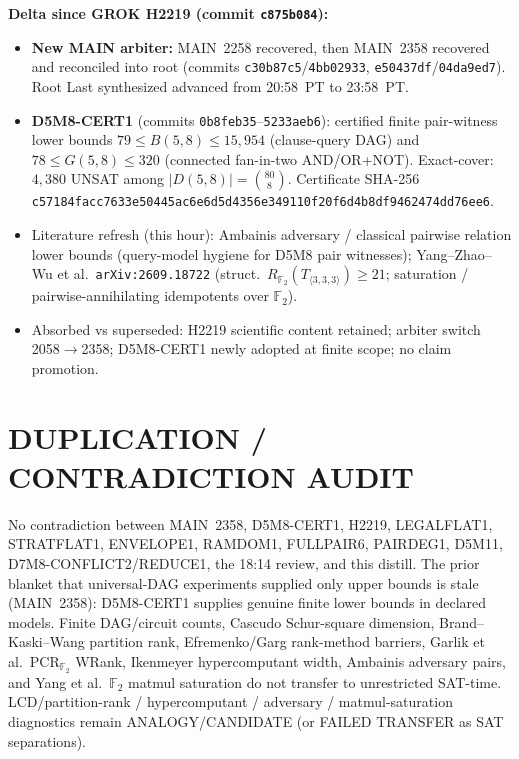 \documentclass[11pt]{article}
\begin{document}
\textbf{Delta since GROK H2219 (commit \texttt{c875b084}):}
\begin{itemize}
\item \textbf{New MAIN arbiter:} MAIN~2258 recovered, then MAIN~2358 recovered
and reconciled into root (commits \texttt{c30b87c5}/\texttt{4bb02933},
\texttt{e50437df}/\texttt{04da9ed7}). Root Last synthesized advanced from
20:58~PT to 23:58~PT.
\item \textbf{D5M8-CERT1} (commits \texttt{0b8feb35}--\texttt{5233aeb6}):
certified finite pair-witness lower bounds
$79\le B(5,8)\le 15{,}954$ (clause-query DAG) and
$78\le G(5,8)\le 320$ (connected fan-in-two AND/OR+NOT). Exact-cover:
$4{,}380$ UNSAT among $|D(5,8)|=\binom{80}{8}$. Certificate SHA-256
\texttt{c57184facc7633e50445ac6e6d5d4356e349110f20f6d4b8df9462474dd76ee6}.
\item Literature refresh (this hour): Ambainis adversary / classical pairwise
relation lower bounds (query-model hygiene for D5M8 pair witnesses);
Yang--Zhao--Wu et al.\ \texttt{arXiv:2609.18722} (struct.\ $R_{\mathbb F_2}(T_{\langle 3,3,3\rangle})\ge 21$;
saturation / pairwise-annihilating idempotents over $\mathbb F_2$).
\item Absorbed vs superseded: H2219 scientific content retained; arbiter switch
2058$\to$2358; D5M8-CERT1 newly adopted at finite scope; no claim promotion.
\end{itemize}

\section*{DUPLICATION / CONTRADICTION AUDIT}
No contradiction between MAIN~2358, D5M8-CERT1, H2219, LEGALFLAT1, STRATFLAT1,
ENVELOPE1, RAMDOM1, FULLPAIR6, PAIRDEG1, D5M11, D7M8-CONFLICT2/REDUCE1, the
18:14 review, and this distill. The prior blanket that universal-DAG experiments
supplied only upper bounds is stale (MAIN~2358): D5M8-CERT1 supplies genuine
finite lower bounds in declared models. Finite DAG/circuit counts, Cascudo
Schur-square dimension, Brand--Kaski--Wang partition rank, Efremenko/Garg
rank-method barriers, Garlik et al.\ PCR$_{\mathbb F_2}$ WRank, Ikenmeyer
hypercomputant width, Ambainis adversary pairs, and Yang et al.\ $\mathbb F_2$
matmul saturation do not transfer to unrestricted SAT-time.
LCD/partition-rank / hypercomputant / adversary / matmul-saturation diagnostics
remain ANALOGY/CANDIDATE (or FAILED TRANSFER as SAT separations).
\end{document}

